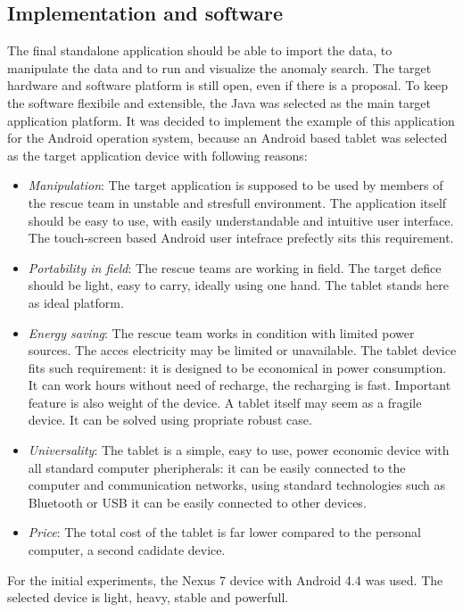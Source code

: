 \documentclass[FM]{tulthesis}
\begin{document}
\subsection{Implementation and software}
The final standalone application should be able to import the data, to manipulate the data and to run and visualize the anomaly search. The target hardware and software platform is still open, even if there is a proposal. To keep the software flexibile and extensible, the Java was selected as the main target application platform. It was decided to implement the example of this application for the Android operation system, because an Android based tablet was selected as the target application device with following reasons:
\begin{itemize}
\item \emph{Manipulation}: The target application is supposed to be used by members of the rescue team in unstable and stresfull environment. The application itself should be easy to use, with easily understandable and intuitive user interface. The touch-screen based Android user intefrace prefectly sits this requirement. 
\item \emph{Portability in field}: The rescue teams are working in field. The target defice should be light, easy to carry, ideally using one hand. The tablet stands here as ideal platform. 
\item \emph{Energy saving}: The rescue team works in condition with limited power sources. The acces electricity may be limited or unavailable. The tablet device fits such requirement: it is designed to be economical in power consumption. It can work hours without need of recharge, the recharging is fast. Important feature is also weight of the device. A tablet itself may seem as a fragile device. It can be solved using propriate robust case.
\item \emph{Universality}: The tablet is a simple, easy to use, power economic device with all standard computer pheripherals: it can be easily connected to the computer and communication networks, using standard technologies such as Bluetooth or USB it can be easily connected to other devices. 
\item \emph{Price}: The total cost of the tablet is far lower compared to the personal computer, a second cadidate device.
\end{itemize}

For the initial experiments, the Nexus 7 device with Android 4.4 was used. The selected device is light, heavy, stable and powerfull.
\end{document}
